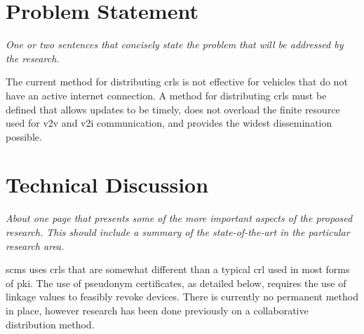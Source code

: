 \documentclass {article}
\newcommand{\sechint}[1]{\small{\emph{#1}} \bigskip}
\begin{document}
\section{Problem Statement}{\sechint{One or two sentences that concisely state the problem that will be addressed by the research.}}

The current method for distributing \gls{crl}s is not effective for vehicles that do not have an active internet connection. A method for distributing \gls{crl}s must be defined that allows updates to be timely, does not overload the finite resource used for \gls{v2v} and \gls{v2i} communication, and provides the widest dissemination possible.

\section{Technical Discussion}{\sechint{About one page that presents some of the more important aspects of the proposed research. This should include a summary of the state-of-the-art in the particular research area.}}

\gls{scms} uses \gls{crl}s that are somewhat different than a typical \gls{crl} used in most forms of \gls{pki}. The use of pseudonym certificates, as detailed below, requires the use of linkage values to feasibly revoke devices. There is currently no permanent method in place, however research has been done previously on a collaborative distribution method.
\end{document}
